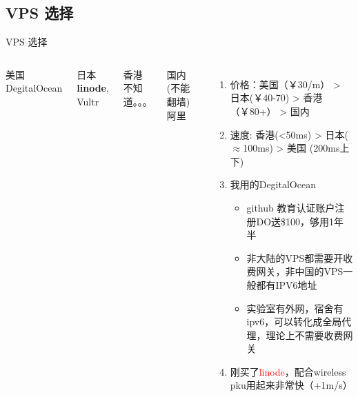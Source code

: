 \documentclass[color=usenames,dvipsnames]{beamer}
\newcommand{\red}[1]{\textcolor{red}{#1}}
\begin{document}
\subsection{VPS 选择}

\begin{frame}{VPS 选择}
 \begin{columns}[c]
 \column{0.3\hsize}
 \begin{block}{美国}
  DegitalOcean
 \end{block}
 \begin{block}{日本}
  \textbf{linode}, Vultr
 \end{block}
 \begin{block}{香港}
  不知道。。。
 \end{block}
 \begin{block}{国内(不能翻墙)}
  阿里
 \end{block}

 \column{0.6\hsize}
 \begin{enumerate}
  \item 价格：美国（￥30/m） > 日本(￥40-70) > 香港（￥80+） > 国内
  \item 速度: 香港(<50ms) > 日本($\approx$100ms) > 美国 (200ms上下)
  \item 我用的DegitalOcean
    \begin{itemize}
     \item github 教育认证账户注册DO送\$100，够用1年半
     \item 非大陆的VPS都需要开收费网关，非中国的VPS一般都有IPV6地址
     \item 实验室有外网，宿舍有ipv6，可以转化成全局代理，理论上不需要收费网关
    \end{itemize}
  \item 刚买了\red{linode}，配合wireless pku用起来非常快（+1m/s）
 \end{enumerate}
 \end{columns}
\end{frame}
\end{document}
